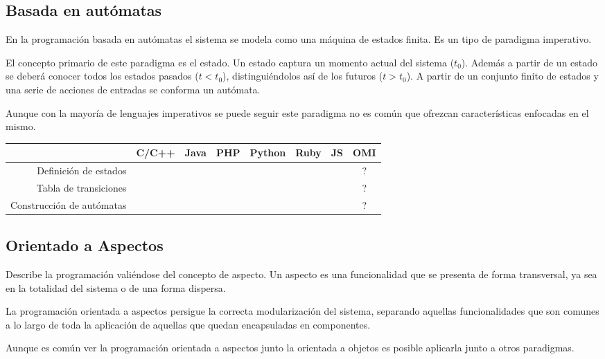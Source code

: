 \subsection{Basada en autómatas}
En la programación basada en autómatas el sistema se modela
como una máquina de estados finita. Es un tipo de paradigma imperativo.

El concepto primario de este paradigma es el estado. Un estado captura 
un momento actual del sistema ($t_0$). Además a partir de un estado se 
deberá conocer todos los estados pasados ($t < t_0$), distinguiéndolos 
así de los futuros ($ t > t_0$). A partir de un conjunto finito 
de estados y una serie de acciones de entradas se conforma un 
autómata.

Aunque con la mayoría de lenguajes imperativos se puede seguir este paradigma no es 
común que ofrezcan características enfocadas en el mismo.

\FloatBarrier
\begin{table}[h]
\begin{center}
 
\begin{tabular}{|r|c|c|c|c|c|c|c|} \hline
 & C/C++ & Java & PHP  & Python & Ruby & JS & OMI\\ \hline
Definición de estados & & & & & &  & ? \\ \hline
Tabla de transiciones & & & & & &  & ? \\ \hline
Construcción de autómatas & & & & & &  & ? \\ \hline
\end{tabular}
\end{center}
\end{table}
\FloatBarrier

\subsection{Orientado a Aspectos}

Describe la programación valiéndose del concepto de aspecto. Un aspecto es una
funcionalidad que se presenta de forma transversal, ya sea en la totalidad 
del sistema o de una forma dispersa. 

La programación orientada a aspectos persigue la correcta modularización del sistema, separando
aquellas funcionalidades que son comunes a lo largo de toda la aplicación de aquellas
que quedan encapsuladas en componentes. 

Aunque es común ver la programación orientada a aspectos junto la orientada a objetos es posible 
aplicarla junto a otros paradigmas. 

